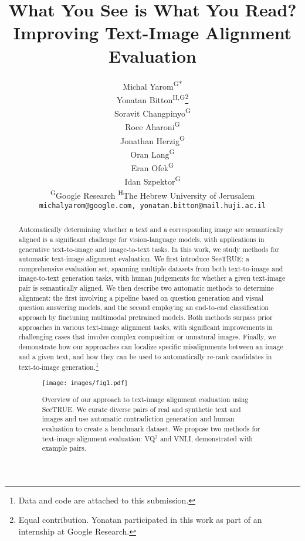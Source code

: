 \documentclass{article}
\title{What You See is What You Read? \\ Improving Text-Image Alignment Evaluation}
\author{Michal Yarom\textsuperscript{G*} \\
  \And
  Yonatan Bitton\textsuperscript{H,G}\thanks{Equal contribution. Yonatan participated in this work as part of an internship at Google Research.} \\
  \And
  Soravit Changpinyo\textsuperscript{G} \\
  \And
  Roee Aharoni\textsuperscript{G} \\
  \And
  Jonathan Herzig\textsuperscript{G} \\
  \And
  Oran Lang\textsuperscript{G} \\
  \And
  Eran Ofek\textsuperscript{G} \\
  \And
  Idan Szpektor\textsuperscript{G}
  \And
  \vspace{-10pt}
  \\
  \textsuperscript{G}Google Research \hspace{20px} \textsuperscript{H}The Hebrew University of Jerusalem\\
  \texttt{michalyarom@google.com, yonatan.bitton@mail.huji.ac.il}
  \\
}
\newcommand{\draftcomment}[3]{{\textcolor{#3}{[#1]#2}}}
\renewcommand{\draftcomment}[3]{}
\newcommand{\yonatan}[1]{\draftcomment{#1}{\textsc{yonatan}}{blue}}
\newcommand{\datasetname}[0]{SeeTRUE\xspace}
\begin{document}
\maketitle

\begin{abstract}
\setcounter{footnote}{0}
\yonatan{Take a look at the ensemble scores at Table 2}Automatically determining whether a text and a corresponding image are semantically aligned is a significant challenge for vision-language models, with applications in generative text-to-image and image-to-text tasks. In this work, we study methods for automatic text-image alignment evaluation. We first introduce \datasetname: a comprehensive evaluation set, spanning multiple datasets from both text-to-image and image-to-text generation tasks, with human judgements for whether a given text-image pair is semantically aligned. We then describe two automatic methods to determine alignment: the first involving a pipeline based on question generation and visual question answering models, and the second employing an end-to-end classification approach by finetuning multimodal pretrained models. Both methods surpass prior approaches in various text-image alignment tasks, with significant improvements in challenging cases that involve complex composition or unnatural images. Finally, we demonstrate how our approaches can localize specific misalignments between an image and a given text, and how they can be used to automatically re-rank candidates in text-to-image generation.\footnote{Data and code are attached to this submission.}%
 \begin{figure}[!h]
    \centering
    \texttt{[image: images/fig1.pdf]}\\
    \caption{Overview of our approach to text-image alignment evaluation using \datasetname. We curate diverse pairs of real and synthetic text and images and use automatic contradiction generation and human evaluation to create a benchmark dataset. We propose two methods for text-image alignment evaluation: VQ$^2$ and VNLI, demonstrated with example pairs. 
    }
    \label{fig:fig1}
\end{figure} \end{abstract}
\end{document}
